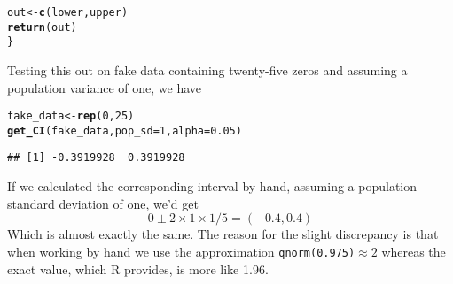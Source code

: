 \documentclass[addpoints,12pt]{exam}\usepackage[]{graphicx}\usepackage[]{color}
\makeatletter
\newcommand{\hlnum}[1]{\textcolor[rgb]{0.686,0.059,0.569}{#1}}%
\newcommand{\hlstd}[1]{\textcolor[rgb]{0.345,0.345,0.345}{#1}}%
\newcommand{\hlkwb}[1]{\textcolor[rgb]{0.69,0.353,0.396}{#1}}%
\newcommand{\hlkwc}[1]{\textcolor[rgb]{0.333,0.667,0.333}{#1}}%
\newcommand{\hlkwd}[1]{\textcolor[rgb]{0.737,0.353,0.396}{\textbf{#1}}}%
\newenvironment{kframe}{%
 \def\at@end@of@kframe{}%
 \ifinner\ifhmode%
  \def\at@end@of@kframe{\end{minipage}}%
  \begin{minipage}{\columnwidth}%
 \fi\fi%
 \def\FrameCommand##1{\hskip\@totalleftmargin \hskip-\fboxsep
 \colorbox{shadecolor}{##1}\hskip-\fboxsep
     \hskip-\linewidth \hskip-\@totalleftmargin \hskip\columnwidth}%
 \MakeFramed {\advance\hsize-\width
   \@totalleftmargin\z@ \linewidth\hsize
   \@setminipage}}%
 {\par\unskip\endMakeFramed%
 \at@end@of@kframe}
\newenvironment{knitrout}{}{} %
\makeatother
\begin{document}
\begin{questions}
\begin{parts}
\begin{solution}
\begin{knitrout}
\begin{kframe}
\begin{alltt}
  \hlstd{out} \hlkwb{<-} \hlkwd{c}\hlstd{(lower, upper)}
  \hlkwd{return}\hlstd{(out)}
\hlstd{\}}
\end{alltt}
\end{kframe}
\end{knitrout}
Testing this out on fake data containing twenty-five zeros and assuming a population variance of one, we have
\begin{knitrout}
\color{fgcolor}\begin{kframe}
\begin{alltt}
\hlstd{fake_data} \hlkwb{<-} \hlkwd{rep}\hlstd{(}\hlnum{0}\hlstd{,} \hlnum{25}\hlstd{)}
\hlkwd{get_CI}\hlstd{(fake_data,} \hlkwc{pop_sd} \hlstd{=} \hlnum{1}\hlstd{,} \hlkwc{alpha} \hlstd{=} \hlnum{0.05}\hlstd{)}
\end{alltt}
\begin{verbatim}
## [1] -0.3919928  0.3919928
\end{verbatim}
\end{kframe}
\end{knitrout}
If we calculated the corresponding interval by hand, assuming a population standard deviation of one, we'd get
  $$0 \pm  2 \times 1 \times 1/5 = (-0.4, 0.4)$$
Which is almost exactly the same. The reason for the slight discrepancy is that when working by hand we use the approximation \texttt{qnorm(0.975)}$\approx 2$ whereas the exact value, which R provides, is more like 1.96.
\end{solution}

\end{parts}
\end{questions}
\end{document}
